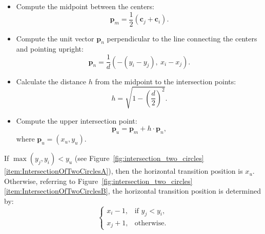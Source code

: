 \documentclass[12pt]{article}
\newcommand{\myvector}[1]{{\boldsymbol{\mathbf{ #1 }}}}
\begin{document}
\begin{itemize}
	\item Compute the midpoint between the centers:
	\begin{equation*}
		\myvector{p}_m = \frac{1}{2} \left( \myvector{c}_j + \myvector{c}_i \right).
	\end{equation*}
	\item Compute the unit vector \( \myvector{p}_n \) perpendicular to the line connecting the centers and pointing upright:
	\begin{equation*}
		\myvector{p}_n = \frac{1}{d} \left( - (y_i - y_j),\ x_i - x_j \right).
	\end{equation*}
	\item Calculate the distance \( h \) from the midpoint to the intersection points:
	\begin{equation*}
		h = \sqrt{1 - \left( \frac{d}{2} \right)^2 }.
	\end{equation*}
	\item Compute the upper intersection point:
	\begin{equation*}
		\myvector{p}_u = \myvector{p}_m + h \cdot \myvector{p}_n,
	\end{equation*}
	where \( \myvector{p}_u = (x_u, y_u) \).
\end{itemize}

If \( \max(y_j, y_i) < y_u \) (see Figure~\ref{fig:intersection_two_circles}\ref*{item:IntersectionOfTwoCirclesA}), then the horizontal transition position is \( x_u \). 
Otherwise, referring to Figure~\ref{fig:intersection_two_circles}\ref*{item:IntersectionOfTwoCirclesB}, the horizontal transition position is determined by:
\begin{equation*}
	\begin{cases} 
		x_i - 1, & \text{if } y_j < y_i, \\ 
		x_j + 1, & \text{otherwise}.
	\end{cases}
\end{equation*}



\end{document}
